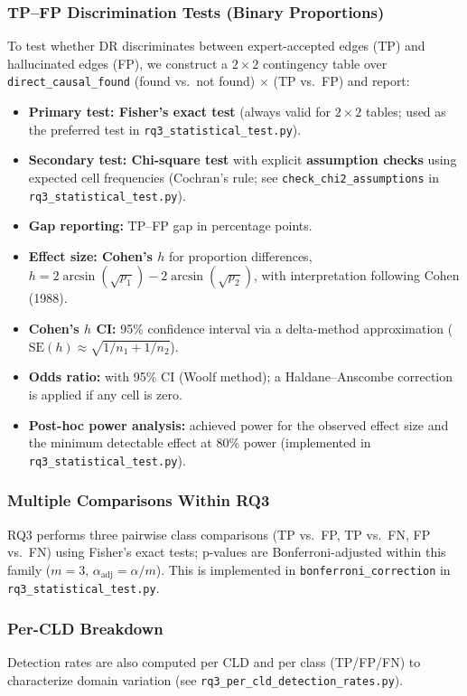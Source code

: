 \subsubsection{TP--FP Discrimination Tests (Binary Proportions)}
To test whether DR discriminates between expert-accepted edges (TP) and hallucinated edges (FP), we construct a $2\times 2$ contingency table over \texttt{direct\_causal\_found} (found vs.\ not found) $\times$ (TP vs.\ FP) and report:
\begin{itemize}[noitemsep]
    \item \textbf{Primary test: Fisher's exact test} (always valid for $2\times 2$ tables; used as the preferred test in \texttt{rq3\_statistical\_test.py}).
    \item \textbf{Secondary test: Chi-square test} with explicit \textbf{assumption checks} using expected cell frequencies (Cochran's rule; see \texttt{check\_chi2\_assumptions} in \texttt{rq3\_statistical\_test.py}).
    \item \textbf{Gap reporting:} TP--FP gap in percentage points.
    \item \textbf{Effect size: Cohen's $h$} for proportion differences, \(h = 2\arcsin(\sqrt{p_1}) - 2\arcsin(\sqrt{p_2})\), with interpretation following Cohen (1988).
    \item \textbf{Cohen's $h$ CI:} 95\% confidence interval via a delta-method approximation (\(\mathrm{SE}(h)\approx\sqrt{1/n_1 + 1/n_2}\)).
    \item \textbf{Odds ratio:} with 95\% CI (Woolf method); a Haldane--Anscombe correction is applied if any cell is zero.
    \item \textbf{Post-hoc power analysis:} achieved power for the observed effect size and the minimum detectable effect at 80\% power (implemented in \texttt{rq3\_statistical\_test.py}).
\end{itemize}

\subsubsection{Multiple Comparisons Within RQ3}
RQ3 performs three pairwise class comparisons (TP vs.\ FP, TP vs.\ FN, FP vs.\ FN) using Fisher's exact tests; p-values are Bonferroni-adjusted within this family (\(m=3\), \(\alpha_{\text{adj}}=\alpha/m\)). This is implemented in \texttt{bonferroni\_correction} in \texttt{rq3\_statistical\_test.py}.

\subsubsection{Per-CLD Breakdown}
Detection rates are also computed per CLD and per class (TP/FP/FN) to characterize domain variation (see \texttt{rq3\_per\_cld\_detection\_rates.py}).

